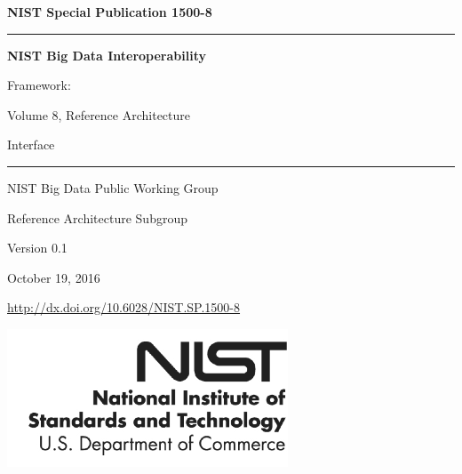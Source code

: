 \documentclass[11pt]{article}
\begin{document}
\begin{flushright}
{\Large\bf NIST Special Publication 1500-8} 

\bigskip\bigskip

\hrule
\bigskip\bigskip

{\Huge\bf\sf
NIST Big Data Interoperability 

Framework:

Volume 8, Reference Architecture 

Interface
}


\bigskip\bigskip
\hrule

\vspace{2cm}

{\large

NIST Big Data Public Working Group

Reference Architecture Subgroup

\vspace{2cm}

Version 0.1

October 19, 2016

\bigskip
\url{http://dx.doi.org/10.6028/NIST.SP.1500-8}

}
\vspace{2cm}

\vfill

\begin{flushright}
\includegraphics{images/nist.png}
\end{flushright}

\end{flushright}

\newpage
\end{document}

